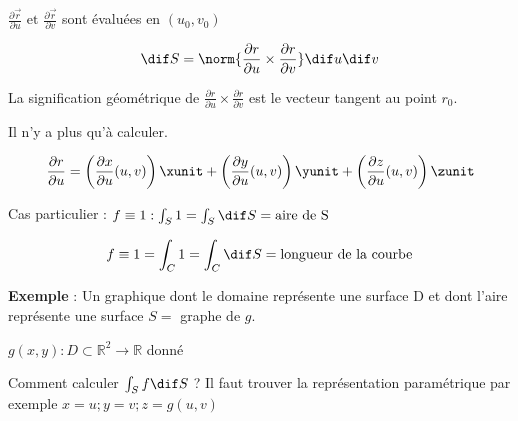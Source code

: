 $\frac{\partial \vec r }{\partial u } \text{ et } \frac{\partial \vec r }{\partial v }$ sont évaluées en $(u_0,v_0)$

\[\dif S = \norm{\frac{\partial r }{\partial u } \times \frac{\partial r }{\partial v }} \dif u \dif v\]

La signification géométrique de $ \frac{\partial r }{\partial u } \times \frac{\partial r }{\partial v }$ est le vecteur tangent au point $r_0$.

Il n'y a plus qu'à calculer.

\[\frac{\partial r }{\partial u} =
\left( \frac{\partial x}{\partial u}(u,v)\right)\xunit +
\left( \frac{\partial y}{\partial u}(u,v)\right)\yunit +
\left(\frac{\partial z}{\partial u}(u,v)\right)\zunit
\]



Cas particulier : $f\equiv 1 : \int_S 1 = \int_S \dif S = \text{aire de S}$

\[f \equiv 1 = \int_C 1 = \int_C \dif S = \text{longueur de la courbe}\]


\textbf{Exemple }: Un graphique dont le domaine représente une surface D et dont l'aire représente une surface $S=$ graphe de $g$.


 $g(x,y) : D\subset\mathbb{R}^2 \to \mathbb{R}$ donné


Comment calculer $\int_Sf \dif S$ ? Il faut trouver la représentation paramétrique par exemple
$x=u; y=v; z=g(u,v)$

